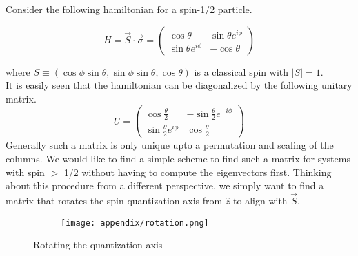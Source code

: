 Consider the following hamiltonian for a spin-1/2 particle.

\begin{equation}\label{eq:spin-half}
    H = \vec{S} \cdot \vec{\sigma} = \begin{pmatrix}
        \cos\theta & \sin\theta e^{i\phi} \\ 
        \sin\theta e^{i\phi} & -\cos\theta    
    \end{pmatrix}
\end{equation}

where $S \equiv (\cos\phi\sin\theta, \sin\phi\sin\theta, \cos\theta)$ is a classical spin with $|S| = 1$. 
\vspace{0.5cm}\\
It is easily seen that the hamiltonian can be diagonalized by the following unitary matrix.
\begin{equation}\label{eq:rot}
    U = \begin{pmatrix}
        \cos\frac{\theta}{2} & -\sin\frac{\theta}{2}e^{-i\phi} \\ 
        \sin\frac{\theta}{2}e^{i\phi} & \cos\frac{\theta}{2}
    \end{pmatrix}
\end{equation}
Generally such a matrix is only unique upto a permutation and scaling of the columns. We would like to find a simple scheme to find such a matrix for systems with spin $>$ 1/2 without having to compute the eigenvectors first. Thinking about this procedure from a different perspective, we simply want to find a matrix that rotates the spin quantization axis from $\hat{z}$ to align with $\vec{S}$.

\begin{figure}[!htb]
    \centering
    \begin{subfigure}[b]{\textwidth}  %
        \centering
        \texttt{[image: appendix/rotation.png]}
    \end{subfigure}
    \caption{Rotating the quantization axis}
\end{figure}
\FloatBarrier \!\!\!\!\!\!\!\!\!\!\!

